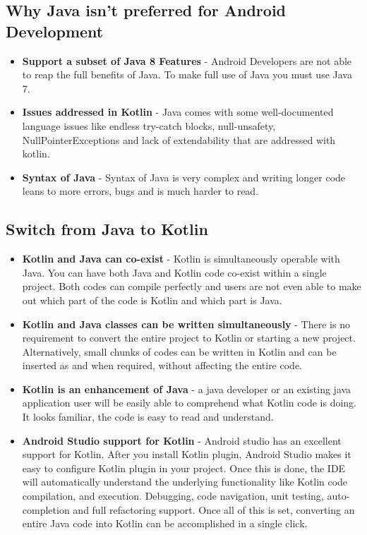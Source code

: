 \subsection{Why Java isn't preferred for Android Development}
\begin{itemize}
    \item \textbf{Support a subset of Java 8 Features} - Android Developers are not able to reap the full benefits of Java. To make full use of Java you must use Java 7. \cite{android_sup_java}
    \item \textbf{Issues addressed in Kotlin} - Java comes with some well-documented language issues like endless try-catch blocks, null-unsafety, NullPointerExceptions and lack of extendability that are addressed with kotlin.
    \item \textbf{Syntax of Java} - Syntax of Java is very complex and writing longer code leans to more errors, bugs and is much harder to read.
\end{itemize}

\subsection{Switch from Java to Kotlin}
\begin{itemize}
    \item \textbf{Kotlin and Java can co-exist} - Kotlin is simultaneously operable with Java. You can have both Java and Kotlin code co-exist within a single project. Both codes can compile perfectly and users are not even able to make out which part of the code is Kotlin and which part is Java.
    \item \textbf{Kotlin and Java classes can be written simultaneously} - There is no requirement to convert the entire project to Kotlin or starting a new project. Alternatively, small chunks of codes can be written in Kotlin and can be inserted as and when required, without affecting the entire code.
    \item \textbf{Kotlin is an enhancement of Java} - a java developer or an existing java application user will be easily able to comprehend what Kotlin code is doing. It looks familiar, the code is easy to read and understand.
   \item \textbf{Android Studio support for Kotlin} - Android studio has an excellent support for Kotlin. After you install Kotlin plugin, Android Studio makes it easy to configure Kotlin plugin in your project. Once this is done, the IDE will automatically understand the underlying functionality like Kotlin code compilation, and execution. Debugging, code navigation, unit testing, auto-completion and full refactoring support. Once all of this is set, converting an entire Java code into Kotlin can be accomplished in a single click.
\end{itemize}
\newpage

